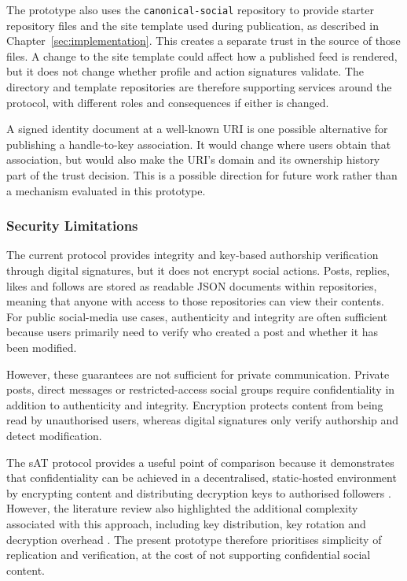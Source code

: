 The prototype also uses the \texttt{canonical-social} repository to provide
starter repository files and the site template used during publication,
as described in Chapter~\ref{sec:implementation}. This creates a separate
trust in the source of those files. A change to the site template could
affect how a published feed is rendered, but it does not change whether
profile and action signatures validate. The directory and template
repositories are therefore supporting services around the protocol, with
different roles and consequences if either is changed.

A signed identity document at a well-known URI is one possible alternative
for publishing a handle-to-key association. It would change where users
obtain that association, but would also make the URI's domain and its
ownership history part of the trust decision. This is a possible direction
for future work rather than a mechanism evaluated in this prototype.

\subsubsection{Security Limitations}\label{sec:limitation-security}

The current protocol provides integrity and key-based authorship verification through
digital signatures, but it does not encrypt social actions. Posts, replies, likes 
and follows are stored as readable JSON documents within repositories, meaning that 
anyone with access to those repositories can view their contents. 
For public social-media use cases, authenticity and integrity are often sufficient because
users primarily need to verify who created a post and whether it has been modified.

However, these guarantees are not sufficient for private communication. Private posts, 
direct messages or restricted-access social groups require confidentiality in addition 
to authenticity and integrity. Encryption protects content from being read by unauthorised 
users, whereas digital signatures only verify authorship and detect modification.

The sAT protocol provides a useful point of comparison because it demonstrates that confidentiality
can be achieved in a decentralised, static-hosted environment by encrypting content and 
distributing decryption keys to authorised followers \cite{sat2026}. However, the literature review 
also highlighted the additional complexity associated with this approach, 
including key distribution, key rotation and decryption overhead \cite{sat2026}. 
The present prototype therefore prioritises simplicity of replication and verification, 
at the cost of not supporting confidential social content.

